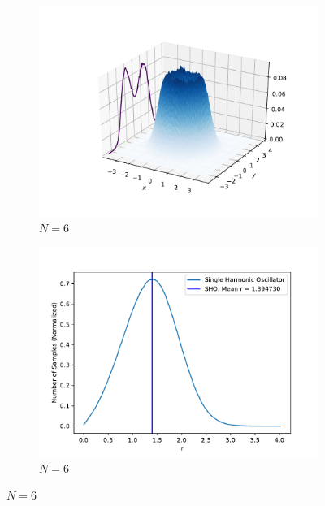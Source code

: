 \documentclass[../main.tex]{subfiles}
\begin{document}
\begin{figure}
\medskip
\begin{subfigure}{0.48\textwidth}
\includegraphics[width=\linewidth]{figures/densitySHO/density3D_SHO_N6_Omega1_2d}
\caption{$N=6$} \label{fig:SHO_density3D_N6_c}
\end{subfigure}\hspace*{\fill}
\begin{subfigure}{0.48\textwidth}
\includegraphics[width=\linewidth]{figures/densitySHO/density_SHO_N6_Omega1_2d}
\caption{$N=6$} \label{fig:SHO_density_N6_d}
\end{subfigure}


\end{figure}
\end{document}
